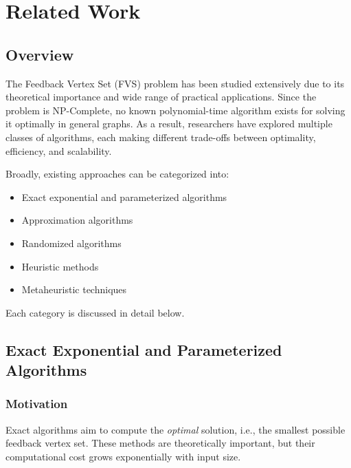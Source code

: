 \documentclass[10pt,a4paper]{report}
\theoremstyle{definition}
\newcommand{\fvs}{\textsc{FVS}}
\begin{document}

\chapter{Related Work}
\label{ch:relatedwork}

\section{Overview}

The Feedback Vertex Set (\fvs{}) problem has been studied extensively due to its theoretical importance and wide range of practical applications.
Since the problem is NP-Complete, no known polynomial-time algorithm exists for solving it optimally in general graphs.
As a result, researchers have explored multiple classes of algorithms, each making different trade-offs between optimality, efficiency, and scalability.

Broadly, existing approaches can be categorized into:
\begin{itemize}
  \item Exact exponential and parameterized algorithms
  \item Approximation algorithms
  \item Randomized algorithms
  \item Heuristic methods
  \item Metaheuristic techniques
\end{itemize}

Each category is discussed in detail below.

\section{Exact Exponential and Parameterized Algorithms}

\subsection{Motivation}

Exact algorithms aim to compute the \emph{optimal} solution, i.e., the smallest possible feedback vertex set.
These methods are theoretically important, but their computational cost grows exponentially with input size.
\end{document}

